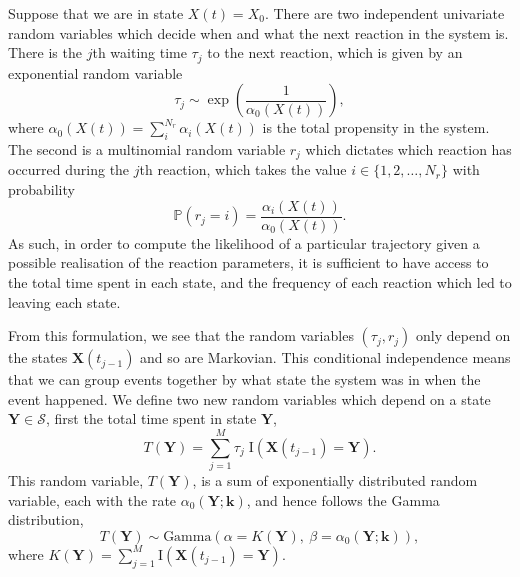 \documentclass[final]{siamltex}
\begin{document}
Suppose that we are in state $X(t) = X_0$. There are two independent
univariate random variables which decide when and what the next
reaction in the system is. There is the $j$th waiting time $\tau_j$ to the
next reaction, which is given by an exponential random variable
\[\tau_j \sim \exp \left ( \frac{1}{\alpha_0(X(t))} \right ),\]
where $\alpha_0(X(t)) =\sum_{i}^{N_r} \alpha_i(X(t))$ is the total
propensity in the system. The second is a multinomial random variable $r_j$
which dictates which reaction has occurred during the $j$th reaction,
which takes the value
$i \in \{1,2,\ldots,N_r\}$ with probability
\[\mathbb{P}(r_j = i) = \frac{\alpha_i(X(t))}{\alpha_0(X(t))}.\]
As such, in order to compute the likelihood of a particular trajectory
given a possible realisation of the reaction parameters, it is
sufficient to have access to the total time spent in each state, and
the frequency of each reaction which led to leaving each state.

From this formulation, we see that the random variables $(\tau_j, r_j)$ only depend on the states $\mathbf{X}(t_{j-1})$ and so are Markovian. This conditional independence means that we can group events together by what state the system was in when the event happened. We define two new random variables which depend on a state $\mathbf{Y} \in \mathcal{S}$, first the total time spent in state $\mathbf{Y}$,
\[
	T(\mathbf{Y}) = \sum\limits_{j=1}^M \tau_j\; \text{I}(\mathbf{X}(t_{j-1}) = \mathbf{Y}).
\]
This random variable, $T(\mathbf{Y})$, is a sum of exponentially
distributed random variable, each with the rate $\alpha_0(\mathbf{Y};\mathbf{k})$, and hence follows the Gamma distribution,
\begin{equation}\label{eqn:chem_time_dist}
	T(\mathbf{Y}) \sim \text{Gamma}\left(\alpha=K(\mathbf{Y}),~\beta = \alpha_0(\mathbf{Y}; \mathbf{k})\right),
\end{equation}
where $K(\mathbf{Y}) = \sum\limits_{j=1}^M \text{I}(\mathbf{X}(t_{j-1}) = \mathbf{Y})$.
\end{document}
